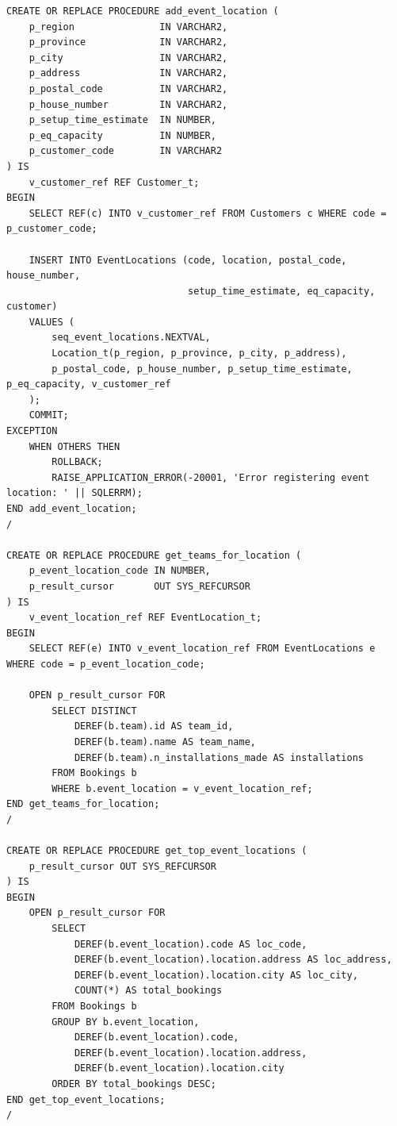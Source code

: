 \begin{verbatim}
CREATE OR REPLACE PROCEDURE add_event_location (
    p_region               IN VARCHAR2,
    p_province             IN VARCHAR2,
    p_city                 IN VARCHAR2,
    p_address              IN VARCHAR2,
    p_postal_code          IN VARCHAR2,
    p_house_number         IN VARCHAR2,
    p_setup_time_estimate  IN NUMBER,
    p_eq_capacity          IN NUMBER,
    p_customer_code        IN VARCHAR2
) IS
    v_customer_ref REF Customer_t;
BEGIN
    SELECT REF(c) INTO v_customer_ref FROM Customers c WHERE code = p_customer_code;

    INSERT INTO EventLocations (code, location, postal_code, house_number, 
                                setup_time_estimate, eq_capacity, customer)
    VALUES (
        seq_event_locations.NEXTVAL,
        Location_t(p_region, p_province, p_city, p_address), 
        p_postal_code, p_house_number, p_setup_time_estimate, p_eq_capacity, v_customer_ref
    );
    COMMIT;
EXCEPTION
    WHEN OTHERS THEN
        ROLLBACK;
        RAISE_APPLICATION_ERROR(-20001, 'Error registering event location: ' || SQLERRM);
END add_event_location;
/

CREATE OR REPLACE PROCEDURE get_teams_for_location (
    p_event_location_code IN NUMBER,
    p_result_cursor       OUT SYS_REFCURSOR
) IS
    v_event_location_ref REF EventLocation_t;
BEGIN
    SELECT REF(e) INTO v_event_location_ref FROM EventLocations e WHERE code = p_event_location_code;

    OPEN p_result_cursor FOR
        SELECT DISTINCT 
            DEREF(b.team).id AS team_id,
            DEREF(b.team).name AS team_name, 
            DEREF(b.team).n_installations_made AS installations
        FROM Bookings b
        WHERE b.event_location = v_event_location_ref;
END get_teams_for_location;
/

CREATE OR REPLACE PROCEDURE get_top_event_locations (
    p_result_cursor OUT SYS_REFCURSOR
) IS
BEGIN
    OPEN p_result_cursor FOR
        SELECT 
            DEREF(b.event_location).code AS loc_code,
            DEREF(b.event_location).location.address AS loc_address,
            DEREF(b.event_location).location.city AS loc_city,
            COUNT(*) AS total_bookings
        FROM Bookings b
        GROUP BY b.event_location, 
            DEREF(b.event_location).code,
            DEREF(b.event_location).location.address, 
            DEREF(b.event_location).location.city
        ORDER BY total_bookings DESC;
END get_top_event_locations;
/
\end{verbatim}

